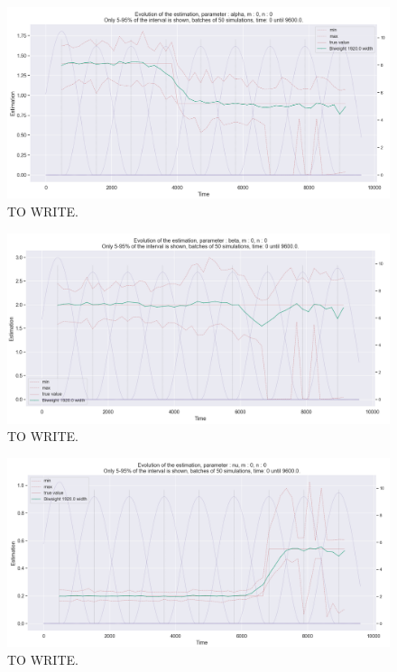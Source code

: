 \begin{figure}
\centering
\includegraphics[width = 0.90 \textwidth]{../imag/chap3/2/Figure_2.png}
\caption{TO WRITE.}
\label{fig:first_estimate_2_alpha}
\end{figure}

\begin{figure}
\centering
\includegraphics[width = 0.90 \textwidth]{../imag/chap3/2/Figure_3.png}
\caption{TO WRITE.}
\label{fig:first_estimate_2_beta}
\end{figure}

\begin{figure}
\centering
\includegraphics[width = 0.90 \textwidth]{../imag/chap3/2/Figure_4.png}
\caption{TO WRITE.}
\label{fig:first_estimate_2_nu}
\end{figure}



















